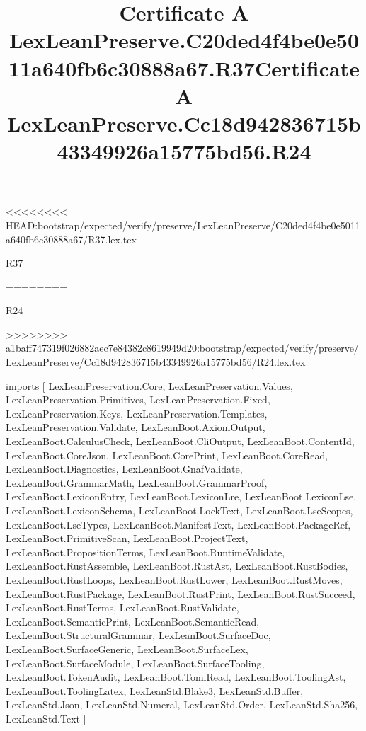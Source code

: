 <<<<<<<< HEAD:bootstrap/expected/verify/preserve/LexLeanPreserve/C20ded4f4be0e5011a640fb6c30888a67/R37.lex.tex
\begin{lexlean}{R37}
\title{Certificate A LexLeanPreserve.C20ded4f4be0e5011a640fb6c30888a67.R37}
========
\begin{lexlean}{R24}
\title{Certificate A LexLeanPreserve.Cc18d942836715b43349926a15775bd56.R24}
>>>>>>>> a1baff747319f026882aec7e84382c8619949d20:bootstrap/expected/verify/preserve/LexLeanPreserve/Cc18d942836715b43349926a15775bd56/R24.lex.tex
\begin{coremodule}
imports [
  LexLeanPreservation.Core,
  LexLeanPreservation.Values,
  LexLeanPreservation.Primitives,
  LexLeanPreservation.Fixed,
  LexLeanPreservation.Keys,
  LexLeanPreservation.Templates,
  LexLeanPreservation.Validate,
  LexLeanBoot.AxiomOutput,
  LexLeanBoot.CalculusCheck,
  LexLeanBoot.CliOutput,
  LexLeanBoot.ContentId,
  LexLeanBoot.CoreJson,
  LexLeanBoot.CorePrint,
  LexLeanBoot.CoreRead,
  LexLeanBoot.Diagnostics,
  LexLeanBoot.GnafValidate,
  LexLeanBoot.GrammarMath,
  LexLeanBoot.GrammarProof,
  LexLeanBoot.LexiconEntry,
  LexLeanBoot.LexiconLre,
  LexLeanBoot.LexiconLse,
  LexLeanBoot.LexiconSchema,
  LexLeanBoot.LockText,
  LexLeanBoot.LseScopes,
  LexLeanBoot.LseTypes,
  LexLeanBoot.ManifestText,
  LexLeanBoot.PackageRef,
  LexLeanBoot.PrimitiveScan,
  LexLeanBoot.ProjectText,
  LexLeanBoot.PropositionTerms,
  LexLeanBoot.RuntimeValidate,
  LexLeanBoot.RustAssemble,
  LexLeanBoot.RustAst,
  LexLeanBoot.RustBodies,
  LexLeanBoot.RustLoops,
  LexLeanBoot.RustLower,
  LexLeanBoot.RustMoves,
  LexLeanBoot.RustPackage,
  LexLeanBoot.RustPrint,
  LexLeanBoot.RustSucceed,
  LexLeanBoot.RustTerms,
  LexLeanBoot.RustValidate,
  LexLeanBoot.SemanticPrint,
  LexLeanBoot.SemanticRead,
  LexLeanBoot.StructuralGrammar,
  LexLeanBoot.SurfaceDoc,
  LexLeanBoot.SurfaceGeneric,
  LexLeanBoot.SurfaceLex,
  LexLeanBoot.SurfaceModule,
  LexLeanBoot.SurfaceTooling,
  LexLeanBoot.TokenAudit,
  LexLeanBoot.TomlRead,
  LexLeanBoot.ToolingAst,
  LexLeanBoot.ToolingLatex,
  LexLeanStd.Blake3,
  LexLeanStd.Buffer,
  LexLeanStd.Json,
  LexLeanStd.Numeral,
  LexLeanStd.Order,
  LexLeanStd.Sha256,
  LexLeanStd.Text
]


\end{coremodule}
\end{lexlean}
\end{lexlean}
